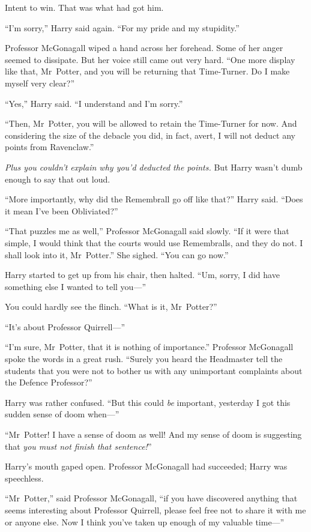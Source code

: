 Intent to win. That was what had got him.

“I’m sorry,” Harry said again.
“For my pride and my stupidity.”

Professor McGonagall wiped a hand across her forehead. Some of her anger seemed to dissipate. But her voice still came out very hard.
“One more display like that, Mr~Potter, and you will be returning that Time-Turner. Do I make myself very clear?”

“Yes,” Harry said.
“I understand and I’m sorry.”

“Then, Mr~Potter, you will be allowed to retain the Time-Turner for now. And considering the size of the debacle you did, in fact, avert, I will not deduct any points from Ravenclaw.”

\emph{Plus you couldn’t explain why you’d deducted the points.} But Harry wasn’t dumb enough to say that out loud.

“More importantly, why did the Remembrall go off like that?” Harry said.
“Does it mean I’ve been Obliviated?”

“That puzzles me as well,” Professor McGonagall said slowly.
“If it were that simple, I would think that the courts would use Remembralls, and they do not. I shall look into it, Mr~Potter.” She sighed.
“You can go now.”

Harry started to get up from his chair, then halted.
“Um, sorry, I did have something else I wanted to tell you—”

You could hardly see the flinch.
“What is it, Mr~Potter?”

“It’s about Professor Quirrell—”

“I’m sure, Mr~Potter, that it is nothing of importance.” Professor McGonagall spoke the words in a great rush.
“Surely you heard the Headmaster tell the students that you were not to bother us with any unimportant complaints about the Defence Professor?”

Harry was rather confused.
“But this could \emph{be} important, yesterday I got this sudden sense of doom when—”

“Mr~Potter! I have a sense of doom as well! And my sense of doom is suggesting that \emph{you must not finish that sentence!}”

Harry’s mouth gaped open. Professor McGonagall had succeeded; Harry was speechless.

“Mr~Potter,” said Professor McGonagall, “if you have discovered anything that seems interesting about Professor Quirrell, please feel free not to share it with me or anyone else. Now I think you’ve taken up enough of my valuable time—”


